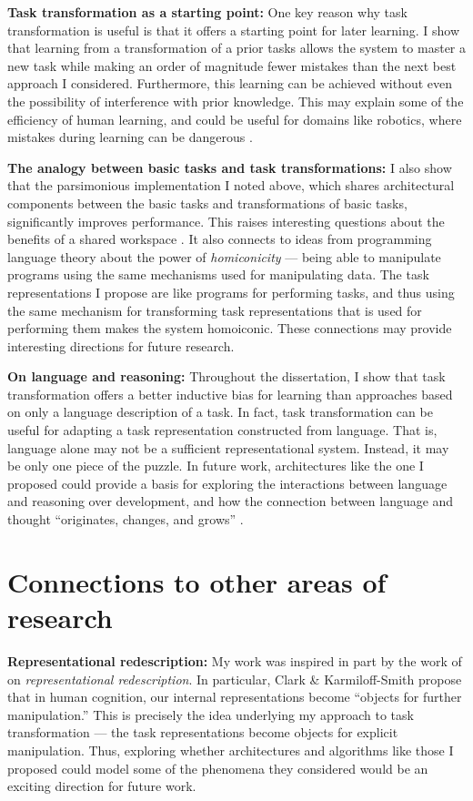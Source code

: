 \documentclass[12pt]{article}
\begin{document}
\textbf{Task transformation as a starting point:} One key reason why task transformation is useful is that it offers a starting point for later learning. I show that learning from a transformation of a prior tasks allows the system to master a new task while making an order of magnitude fewer mistakes than the next best approach I considered. Furthermore, this learning can be achieved without even the possibility of interference with prior knowledge. This may explain some of the efficiency of human learning, and could be useful for domains like robotics, where mistakes during learning can be dangerous \citep{Turchetta2016}. 

\textbf{The analogy between basic tasks and task transformations:} I also show that the parsimonious implementation I noted above, which shares architectural components between the basic tasks and transformations of basic tasks, significantly improves performance. This raises interesting questions about the benefits of a shared workspace \citep[c.f.][]{Baars2005}. It also connects to ideas from programming language theory about the power of \emph{homiconicity} --- being able to manipulate programs using the same mechanisms used for manipulating data. The task representations I propose are like programs for performing tasks, and thus using the same mechanism for transforming task representations that is used for performing them makes the system homoiconic. These connections may provide interesting directions for future research.

\textbf{On language and reasoning:} Throughout the dissertation, I show that task transformation offers a better inductive bias for learning than approaches based on only a language description of a task. In fact, task transformation can be useful for adapting a task representation constructed from language. That is, language alone may not be a sufficient representational system. Instead, it may be only one piece of the puzzle. In future work, architectures like the one I proposed could provide a basis for exploring the interactions between language and reasoning over development, and how the connection between language and thought ``originates, changes, and grows'' \citep{Vygotsky1934}.

\section{Connections to other areas of research}

\textbf{Representational redescription:} My work was inspired in part by the work of \citet{Karmiloff-Smith1986,Clark1993} on \emph{representational redescription}. In particular, Clark \& Karmiloff-Smith propose that in human cognition, our internal representations become ``objects for further manipulation.'' This is precisely the idea underlying my approach to task transformation --- the task representations become objects for explicit manipulation. Thus, exploring whether architectures and algorithms like those I proposed could model some of the phenomena they considered would be an exciting direction for future work. 
\end{document}
